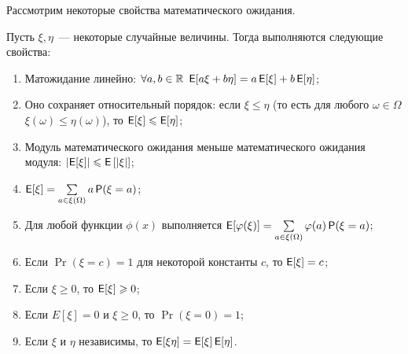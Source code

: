 Рассмотрим некоторые свойства математического ожидания.
\begin{theorem}
    Пусть \(\xi, \eta\)~--- некоторые случайные величины. Тогда выполняются следующие свойства:
    \begin{enumerate}
        \item Матожидание линейно: \(\forall a, b \in \mathbb{R}\ \operatorname{\mathsf{E}}[a\xi + b\eta] = a\operatorname{\mathsf{E}}[\xi] + b\operatorname{\mathsf{E}}[\eta]\);
        \item Оно сохраняет относительный порядок: если \(\xi \leq \eta\) (то есть для любого \(\omega \in \Omega\) \(\xi(\omega) \leq \eta(\omega)\)), то \(\operatorname{\mathsf{E}}[\xi] \leqslant \operatorname{\mathsf{E}}[\eta]\);
        \item Модуль математического ожидания меньше математического ожидания модуля: \(\left|\operatorname{\mathsf{E}}[\xi]\right| \leqslant \operatorname{\mathsf{E}}\left[|\xi\right|]\);
        \item \(\operatorname{\mathsf{E}}[\xi] = \sum\limits_{a \in \xi(\Omega)} a\operatorname{\mathsf{P}}(\xi = a)\);
        \item Для любой функции \(\phi(x)\) выполняется \(\operatorname{\mathsf{E}}[\varphi(\xi)] = \sum\limits_{a \in \xi(\Omega)} \varphi(a)\operatorname{\mathsf{P}}(\xi = a)\);
        \item Если \(\Pr(\xi = c) = 1\) для некоторой константы \(c\), то \(\operatorname{\mathsf{E}}[\xi] = c\);
        \item Если \(\xi \geq 0\), то \(\operatorname{\mathsf{E}}[\xi] \geqslant 0\); 
        \item Если \(E[\xi] = 0\) и \(\xi \geq 0\), то \(\Pr(\xi = 0) = 1\);
        \item Если \(\xi\) и \(\eta\) независимы, то \(\operatorname{\mathsf{E}}[\xi\eta] = \operatorname{\mathsf{E}}[\xi]\operatorname{\mathsf{E}}[\eta]\).
    \end{enumerate}
\end{theorem}

